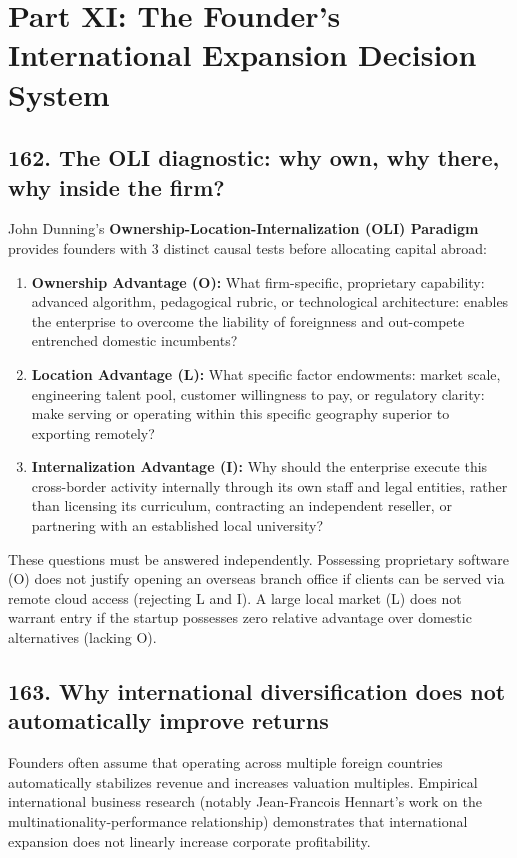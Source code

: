 \section{Part XI: The Founder's International Expansion Decision System}

\subsection{162. The OLI diagnostic: why own, why there, why inside the firm?}

John Dunning's \textbf{Ownership-Location-Internalization (OLI) Paradigm} provides founders with 3 distinct causal tests before allocating capital abroad:
\begin{enumerate}
    \item \textbf{Ownership Advantage (O):} What firm-specific, proprietary capability: advanced algorithm, pedagogical rubric, or technological architecture: enables the enterprise to overcome the liability of foreignness and out-compete entrenched domestic incumbents?
    \item \textbf{Location Advantage (L):} What specific factor endowments: market scale, engineering talent pool, customer willingness to pay, or regulatory clarity: make serving or operating within this specific geography superior to exporting remotely?
    \item \textbf{Internalization Advantage (I):} Why should the enterprise execute this cross-border activity internally through its own staff and legal entities, rather than licensing its curriculum, contracting an independent reseller, or partnering with an established local university?
\end{enumerate}

These questions must be answered independently. Possessing proprietary software (O) does not justify opening an overseas branch office if clients can be served via remote cloud access (rejecting L and I). A large local market (L) does not warrant entry if the startup possesses zero relative advantage over domestic alternatives (lacking O).

\subsection{163. Why international diversification does not automatically improve returns}

Founders often assume that operating across multiple foreign countries automatically stabilizes revenue and increases valuation multiples. Empirical international business research (notably Jean-Francois Hennart's work on the multinationality-performance relationship) demonstrates that international expansion does not linearly increase corporate profitability.

